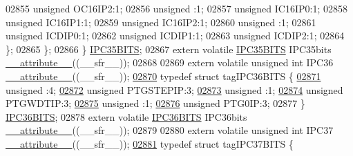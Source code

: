 \begin{DoxyCode}
02855       \textcolor{keywordtype}{unsigned} OC16IP2:1;
02856       \textcolor{keywordtype}{unsigned} :1;
02857       \textcolor{keywordtype}{unsigned} IC16IP0:1;
02858       \textcolor{keywordtype}{unsigned} IC16IP1:1;
02859       \textcolor{keywordtype}{unsigned} IC16IP2:1;
02860       \textcolor{keywordtype}{unsigned} :1;
02861       \textcolor{keywordtype}{unsigned} ICDIP0:1;
02862       \textcolor{keywordtype}{unsigned} ICDIP1:1;
02863       \textcolor{keywordtype}{unsigned} ICDIP2:1;
02864     \};
02865   \};
02866 \} \hyperlink{a00014_d9/d8b/a00547}{IPC35BITS};
02867 \textcolor{keyword}{extern} \textcolor{keyword}{volatile} \hyperlink{a00014_d9/d8b/a00547}{IPC35BITS} IPC35bits \hyperlink{a00015_a493c46f03454991ccc5aa7a6e1dfb2a7}{\_\_attribute\_\_}((\_\_sfr\_\_));
02868 
02869 \textcolor{keyword}{extern} \textcolor{keyword}{volatile} \textcolor{keywordtype}{unsigned} \textcolor{keywordtype}{int}  IPC36 \hyperlink{a00015_a493c46f03454991ccc5aa7a6e1dfb2a7}{\_\_attribute\_\_}((\_\_sfr\_\_));
\hypertarget{a00015_source_l02870}{}\hyperlink{a00014}{02870} \textcolor{keyword}{typedef} \textcolor{keyword}{struct }tagIPC36BITS \{
\hypertarget{a00015_source_l02871}{}\hyperlink{a00014_adf71f3d8410c1f1dbbc96680a92c49af}{02871}   \textcolor{keywordtype}{unsigned} :4;
\hypertarget{a00015_source_l02872}{}\hyperlink{a00014_a9d3fa792c6cf33d5a01c6685e328b633}{02872}   \textcolor{keywordtype}{unsigned} PTGSTEPIP:3;
\hypertarget{a00015_source_l02873}{}\hyperlink{a00014_acaf2d0924a107ec6e8d2e31febaf66f9}{02873}   \textcolor{keywordtype}{unsigned} :1;
\hypertarget{a00015_source_l02874}{}\hyperlink{a00014_a54e9e5a9bb9183401b4d4314b91171b9}{02874}   \textcolor{keywordtype}{unsigned} PTGWDTIP:3;
\hypertarget{a00015_source_l02875}{}\hyperlink{a00014_a4d97cc5f7d51d22fc2bf3eab35c9cb7f}{02875}   \textcolor{keywordtype}{unsigned} :1;
\hypertarget{a00015_source_l02876}{}\hyperlink{a00014_a41d07d63e8f94ad7273e13762100efd7}{02876}   \textcolor{keywordtype}{unsigned} PTG0IP:3;
02877 \} \hyperlink{a00014_de/de7/a00550}{IPC36BITS};
02878 \textcolor{keyword}{extern} \textcolor{keyword}{volatile} \hyperlink{a00014_de/de7/a00550}{IPC36BITS} IPC36bits \hyperlink{a00015_a493c46f03454991ccc5aa7a6e1dfb2a7}{\_\_attribute\_\_}((\_\_sfr\_\_));
02879 
02880 \textcolor{keyword}{extern} \textcolor{keyword}{volatile} \textcolor{keywordtype}{unsigned} \textcolor{keywordtype}{int}  IPC37 \hyperlink{a00015_a493c46f03454991ccc5aa7a6e1dfb2a7}{\_\_attribute\_\_}((\_\_sfr\_\_));
\hypertarget{a00015_source_l02881}{}\hyperlink{a00014}{02881} \textcolor{keyword}{typedef} \textcolor{keyword}{struct }tagIPC37BITS \{

\end{DoxyCode}
